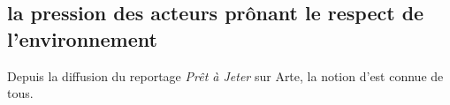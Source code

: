 \subsection{la pression des acteurs prônant le respect de l'environnement }
Depuis la diffusion du reportage \textit{Prêt à Jeter} sur Arte, la notion d'\op est connue de tous. 